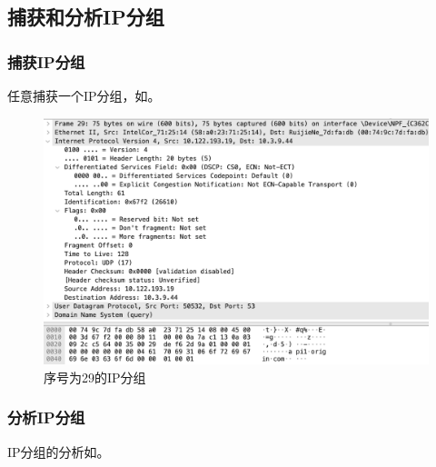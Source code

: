 \documentclass[lang=cn,11pt,a4paper,cite=authornum]{paper}
\begin{document}
\subsection{捕获和分析IP分组}

\subsubsection{捕获IP分组}

任意捕获一个IP分组，如。

\begin{figure}[htbp]
    \centering
    \includegraphics[width=0.7\linewidth]{./Images/IP0.png}
    \caption{序号为29的IP分组\label{fig:ip0}}
\end{figure}

\subsubsection{分析IP分组}

IP分组的分析如。
\end{document}
